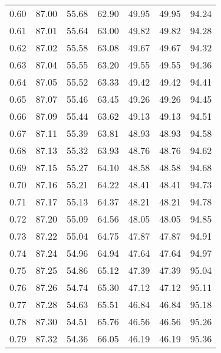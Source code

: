 \begin{tabular}{|c|c|c|c|c|c|c|}
      0.60 &     87.00 &     55.68 &      62.90 &   49.95 &      49.95 &         94.24 \\
      0.61 &     87.01 &     55.64 &      63.00 &   49.82 &      49.82 &         94.28 \\
      0.62 &     87.02 &     55.58 &      63.08 &   49.67 &      49.67 &         94.32 \\
      0.63 &     87.04 &     55.55 &      63.20 &   49.55 &      49.55 &         94.36 \\
      0.64 &     87.05 &     55.52 &      63.33 &   49.42 &      49.42 &         94.41 \\
      0.65 &     87.07 &     55.46 &      63.45 &   49.26 &      49.26 &         94.45 \\
      0.66 &     87.09 &     55.44 &      63.62 &   49.13 &      49.13 &         94.51 \\
      0.67 &     87.11 &     55.39 &      63.81 &   48.93 &      48.93 &         94.58 \\
      0.68 &     87.13 &     55.32 &      63.93 &   48.76 &      48.76 &         94.62 \\
      0.69 &     87.15 &     55.27 &      64.10 &   48.58 &      48.58 &         94.68 \\
      0.70 &     87.16 &     55.21 &      64.22 &   48.41 &      48.41 &         94.73 \\
      0.71 &     87.17 &     55.13 &      64.37 &   48.21 &      48.21 &         94.78 \\
      0.72 &     87.20 &     55.09 &      64.56 &   48.05 &      48.05 &         94.85 \\
      0.73 &     87.22 &     55.04 &      64.75 &   47.87 &      47.87 &         94.91 \\
      0.74 &     87.24 &     54.96 &      64.94 &   47.64 &      47.64 &         94.97 \\
      0.75 &     87.25 &     54.86 &      65.12 &   47.39 &      47.39 &         95.04 \\
      0.76 &     87.26 &     54.74 &      65.30 &   47.12 &      47.12 &         95.11 \\
      0.77 &     87.28 &     54.63 &      65.51 &   46.84 &      46.84 &         95.18 \\
      0.78 &     87.30 &     54.51 &      65.76 &   46.56 &      46.56 &         95.26 \\
      0.79 &     87.32 &     54.36 &      66.05 &   46.19 &      46.19 &         95.36 \\

\end{tabular}
